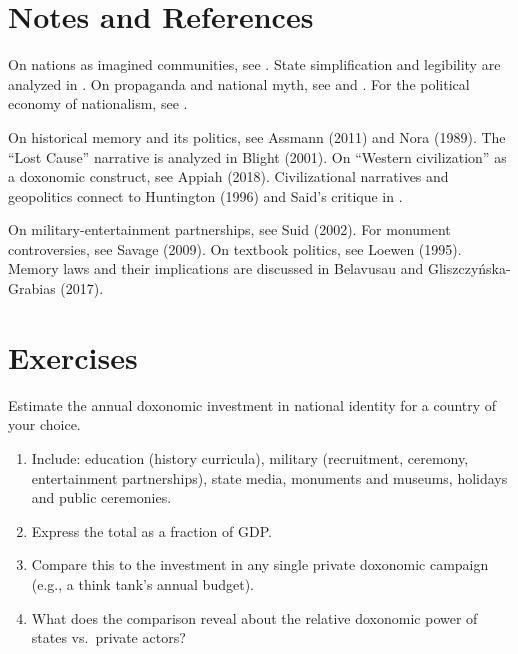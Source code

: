 \section{Notes and References}
\label{sec:ch27-notes}

On nations as imagined communities, see \textcite{anderson2006}.
State simplification and legibility are analyzed in \textcite{scott1998}.
On propaganda and national myth, see \textcite{lippmann1922} and \textcite{bernays1928}.
For the political economy of nationalism, see \textcite{acemoglu2012}.

On historical memory and its politics, see Assmann (2011) and Nora (1989).
The ``Lost Cause'' narrative is analyzed in Blight (2001).
On ``Western civilization'' as a doxonomic construct, see Appiah (2018).
Civilizational narratives and geopolitics connect to Huntington (1996) and Said's critique in \textcite{said1978}.

On military-entertainment partnerships, see Suid (2002).
For monument controversies, see Savage (2009).
On textbook politics, see Loewen (1995).
Memory laws and their implications are discussed in Belavusau and Gliszczy\'{n}ska-Grabias (2017).

\section{Exercises}

\begin{exercise}
Estimate the annual doxonomic investment in national identity for a country of your choice.
\begin{enumerate}[nosep]
  \item Include: education (history curricula), military (recruitment, ceremony, entertainment partnerships), state media, monuments and museums, holidays and public ceremonies.
  \item Express the total as a fraction of GDP.
  \item Compare this to the investment in any single private doxonomic campaign (e.g., a think tank's annual budget).
  \item What does the comparison reveal about the relative doxonomic power of states vs.\ private actors?
\end{enumerate}
\end{exercise}

